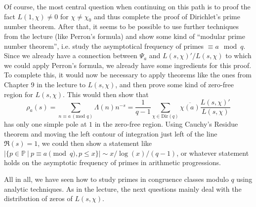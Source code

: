 \documentclass{scrartcl}
\newcommand{\primes}{\mathbb{P}}
\theoremstyle{definition}
\begin{document}
Of course, the most central question when continuing on this path is to proof the fact $L(1, \chi) \neq 0$ for $\chi \neq \chi_0$ and thus complete the proof of Dirichlet's prime number theorem.
After that, it seems to be possible to use further techniques from the lecture (like Perron's formula) and show some kind of ``modular prime number theorem'', i.e. study the asymptotical frequency of primes $\equiv a \mod q$.
Since we already have a connection between $\Psi_a$ and $L(s, \chi)'/L(s, \chi)$ to which we could apply Perron's formula, we already have some ingredients for this proof.
To complete this, it would now be necessary to apply theorems like the ones from Chapter 9 in the lecture to $L(s, \chi)$, and then prove some kind of zero-free region for $L(s, \chi)$.
This would then show that
\begin{equation*}
    \rho_a(s) = \sum_{n \equiv a \ (\text{mod $q$})} \Lambda(n) n^{-s} = \frac 1 {q - 1} \sum_{\chi \in \mathrm{Dir}(q)} \overline{\chi(a)} \frac {L(s, \chi)'} {L(s, \chi)}
\end{equation*}
has only one simple pole at $1$ in the zero-free region.
Using Cauchy's Residue theorem and moving the left contour of integration just left of the line $\Re(s) = 1$, we could then show a statement like $|\{ p \in \primes \ | \ p \equiv a \pmod q, p \leq x\}| \sim x / \log(x) / (q - 1)$, or whatever statement holds on the asymptotic frequency of primes in arithmetic progressions.

All in all, we have seen how to study primes in congruence classes modulo $q$ using analytic techniques.
As in the lecture, the next questions mainly deal with the distribution of zeros of $L(s, \chi)$.

\printbibliography
\end{document}
